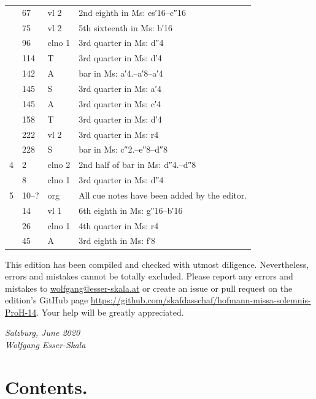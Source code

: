 \documentclass[parskip=full]{scrreprt}
\newif\iftemplate\templatetrue
\begin{document}
\begin{longtable}{lll L{10cm}}
	  & 67    & vl 2   & 2nd eighth in Ms: es′16–c″16 \\
	  & 75    & vl 2   & 5th sixteenth in Ms: b′16 \\
	  & 96    & clno 1 & 3rd quarter in Ms: d″4 \\
	  & 114   & T      & 3rd quarter in Ms: d′4 \\
	  & 142   & A      & bar in Ms: a′4.–a′8–a′4 \\
	  & 145   & S      & 3rd quarter in Ms: a′4 \\
	  & 145   & A      & 3rd quarter in Ms: c′4 \\
	  & 158   & T      & 3rd quarter in Ms: d′4 \\
	  & 222   & vl 2   & 3rd quarter in Ms: r4 \\
	  & 228   & S      & bar in Ms: c″2.–e″8–d″8 \\
	4 & 2     & clno 2 & 2nd half of bar in Ms: d″4.–d″8 \\
	  & 8     & clno 1 & 3rd quarter in Ms: d″4 \\
	5 & 10–?  & org    & All cue notes have been added by the editor. \\
	  & 14    & vl 1   & 6th eighth in Ms: g″16–b′16 \\
	  & 26    & clno 1 & 4th quarter in Ms: r4 \\
	  & 45    & A      & 3rd eighth in Ms: f′8 \\
	\bottomrule
\end{longtable}


This edition has been compiled and checked with utmost diligence. Nevertheless, errors and mistakes cannot be totally excluded. Please report any errors and mistakes to \url{wolfgang@esser-skala.at} or create an issue or pull request on the edition’s GitHub page \url{https://github.com/skafdasschaf/hofmann-missa-solemnis-ProH-14}. Your help will be greatly appreciated.

\bigskip
\textit{Salzburg, June 2020\\
Wolfgang Esser-Skala}

\cleardoublepage
\chapter*{Contents.}


\cleardoublepage
\fi

\iftemplate

\fi
\end{document}
